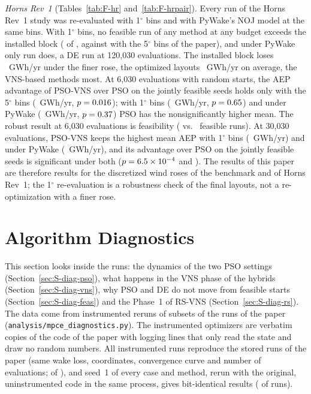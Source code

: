 \documentclass[10pt]{article}
\begin{document}
\emph{Horns Rev~1} (Tables~\ref{tab:F-hr} and~\ref{tab:F-hrpair}). Every run of the Horns Rev~1 study was re-evaluated with 1$^\circ$ bins and with PyWake's NOJ model at the same bins. With 1$^\circ$ bins, no feasible run of any method at any budget exceeds the installed block (\NFHRAboveOneTotal{} of \NFHRNFeas, against \NFHRAboveFiveTotal{} with the 5$^\circ$ bins of the paper), and under PyWake only \NFHRAbovePyWakeTotal{} run does, a DE run at 120,030 evaluations. The installed block loses \NFHRInstDrop~GWh/yr under the finer rose, the optimized layouts \NFHRMeanDrop~GWh/yr on average, the VNS-based methods most. %
 At 6,030 evaluations with random starts, the AEP advantage of PSO-VNS over PSO on the \NFHRPairSixKOneN{} jointly feasible seeds holds only with the 5$^\circ$ bins (\NFHRPairSixKFive~GWh/yr, $p=0.016$); with 1$^\circ$ bins (\NFHRPairSixKOne~GWh/yr, $p=0.65$) and under PyWake (\NFHRPairSixKPyWake~GWh/yr, $p=0.37$) PSO has the nonsignificantly higher mean. The robust result at 6,030 evaluations is feasibility (\NHRFeasPSOVNS{} vs.\ \NHRFeasPSO{} feasible runs). %
 At 30,030 evaluations, PSO-VNS keeps the highest mean AEP with 1$^\circ$ bins (\NFHRThirtyKBestOneAEP~GWh/yr) and under PyWake (\NFHRThirtyKBestPyWakeAEP~GWh/yr), and its advantage over PSO on the \NFHRPairThirtyKOneN{} jointly feasible seeds is significant under both ($p=6.5\times10^{-4}$ and \NFHRPairThirtyKPyWakeP). %
 The results of this paper are therefore results for the discretized wind roses of the benchmark and of Horns Rev~1; the 1$^\circ$ re-evaluation is a robustness check of the final layouts, not a re-optimization with a finer rose.


\FloatBarrier


\FloatBarrier
\section{Algorithm Diagnostics}
\label{sec:S-diag}
This section looks inside the runs: the dynamics of the two PSO settings (Section~\ref{sec:S-diag-pso}), what happens in the VNS phase of the hybrids (Section~\ref{sec:S-diag-vns}), why PSO and DE do not move from feasible starts (Section~\ref{sec:S-diag-feas}) and the Phase~1 of RS-VNS (Section~\ref{sec:S-diag-rs}). The data come from instrumented reruns of subsets of the runs of the paper (\texttt{analysis/mpce\_diagnostics.py}). The instrumented optimizers are verbatim copies of the code of the paper with logging lines that only read the state and draw no random numbers. All \NDVerRuns{} instrumented runs reproduce the stored runs of the paper (same wake loss, coordinates, convergence curve and number of evaluations; \NDVerStoredMatch{} of \NDVerRuns), and seed~1 of every case and method, rerun with the original, uninstrumented code in the same process, gives bit-identical results (\NDVerBitMatch{} of \NDVerBitRuns{} runs). %

\end{document}
